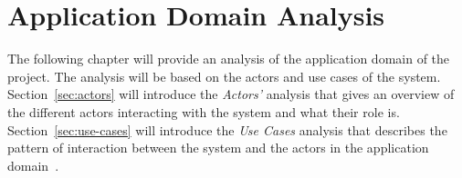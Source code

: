 \chapter{Application Domain Analysis}\label{ch:application-domain-analysis}
The following chapter will provide an analysis of the application domain of the project.
The analysis will be based on the actors and use cases of the system.
Section~\ref{sec:actors} will introduce the \textit{Actors'} analysis that gives an overview of the different actors
interacting with the system and what their role is.
Section~\ref{sec:use-cases} will introduce the \textit{Use Cases} analysis that describes the pattern of interaction
between the system and the actors in the application domain~\cite{mathiassen2018}.
\pagebreak



